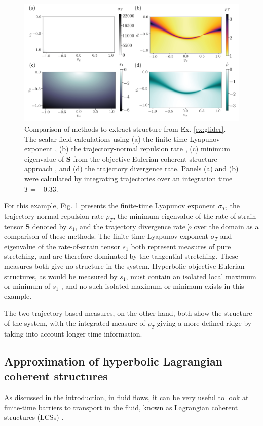 \documentclass[twocolumn]{svjour3}
\newcommand{\edit}[3]{{\color{red} #2}}
\begin{document}
\begin{figure}
\centering
\includegraphics[width=\linewidth]{Fig13}
\caption{Comparison of methods to extract structure from Ex. \ref{ex:glider}. The scalar field calculations using (a) the finite-time Lyapunov exponent \cite{shadden2005definition}, (b) the trajectory-normal repulsion rate \cite{haller_variational_2011}, (c) minimum eigenvalue of $\mathbf{S}$ from the objective Eulerian coherent structure approach \cite{serra_objective_2016}, and (d) the trajectory divergence rate. Panels (a) and (b) were calculated by integrating trajectories over an integration time $T=-0.33$.}
\label{fig:method-comparison}
\end{figure}

For this example, Fig. \ref{fig:method-comparison} presents the finite-time Lyapunov exponent $\sigma_T$, the trajectory-normal repulsion rate $\rho_T$, the \edit{largest}{minimum}{23} eigenvalue of the rate-of-strain tensor $\mathbf{S}$ denoted by $s_1$, and the trajectory divergence rate $\dot{\rho}$ over the domain as a comparison of these methods. The finite-time Lyapunov exponent $\sigma_T$ and eigenvalue of the rate-of-strain tensor $s_1$ both represent measures of pure stretching, and are therefore dominated by the tangential stretching. These measures both give no structure in the system. Hyperbolic objective Eulerian structures, as would be measured by $s_1$, must contain an isolated local maximum or minimum of $s_1$ \cite{serra_objective_2016}, and no such isolated maximum or minimum exists in this example. 

The two trajectory-based measures, on the other hand, both show the structure of the system, with the integrated measure of $\rho_T$ giving a more defined ridge by taking into account longer time information.

\subsection{Approximation of hyperbolic Lagrangian coherent structures}\label{ss:LCSapprox}
As discussed in the introduction, in fluid flows, it can be very useful to look at finite-time barriers to transport in the fluid, known as Lagrangian coherent structures (LCSs) \cite{shadden2005definition}.
\end{document}
